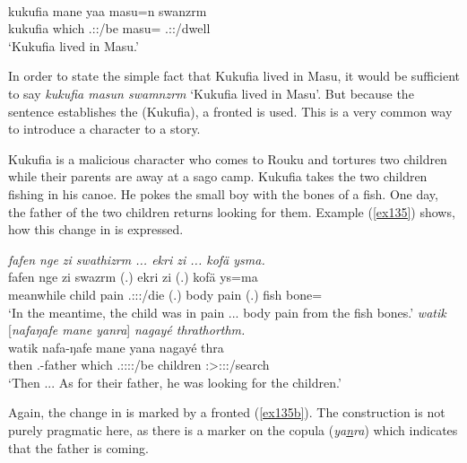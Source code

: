 \begin{exe}
	\\
	\gll kukufia mane yaa masu=n swanzrm\\
	kukufia which \Tsg.\Masc:\Pst:\Ipfv/be masu={\Loc} \Tsg.\Masc:\Pst:\Dur/dwell\\
	\trans `Kukufia lived in Masu.'
	\label{ex134}
\end{exe}

In order to state the simple fact that Kukufia lived in Masu, it would be sufficient to say \emph{kukufia masun swamnzrm} `Kukufia lived in Masu'. But because the sentence establishes the  (Kukufia), a fronted  is used. This is a very common way to introduce a character to a story.

Kukufia is a malicious character who comes to Rouku and tortures two children while their parents are away at a sago camp. Kukufia takes the two children fishing in his canoe. He pokes the small boy with the bones of a fish. One day, the father of the two children returns looking for them. Example (\ref{ex135}) shows, how this change in  is expressed.

\begin{exe}
	\ex \label{ex135}
	\begin{xlist}
	\ex \label{ex135a}
	\emph{fafen nge zi swathizrm ... ekri zi ... kofä ysma.}\\
	\gll fafen nge zi swazrm (.) ekri zi (.) kofä ys=ma\\
	meanwhile child pain \Tsg.\Masc:\Sbj:\Pst:\Dur/die (.) body pain (.) fish bone=\Char\\
	\trans `In the meantime, the child was in pain ... body pain from the fish bones.'
	\ex \label{ex135b} \emph{watik} [\emph{nafaŋafe mane yanra}] \emph{nagayé thrathorthm.}\\
	\gll watik nafa-ŋafe mane yana nagayé thra\\
	then \Third.\Poss-father which \Tsg.\Masc:\Sbj:\Pst:\Ipfv:\Venit/be children \Stsg:\Sbj>\Stpl:\Obj:\Irr:\Pfv/search\\
	\trans `Then ... As for their father, he was looking for the children.'\\
	\end{xlist}
\end{exe}

Again, the change in  is marked by a fronted  (\ref{ex135b}). The construction is not purely pragmatic here, as there is a  marker on the copula (\emph{ya\uline{n}ra}) which indicates that the father is coming.

